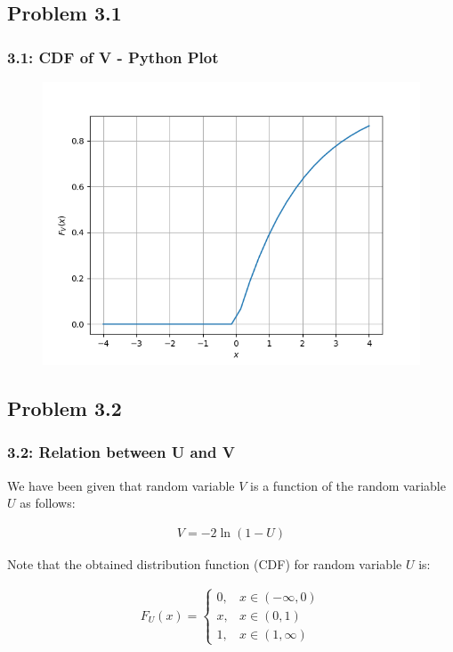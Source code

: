 \documentclass{beamer}
\begin{document}
\subsection{Problem 3.1}
\begin{frame}
	\frametitle{3.1: CDF of V - Python Plot}
	\begin{figure}
		\centerline{\includegraphics[width=\textheight]{../figs/log_cdf.png}}
		\label{fig6}
	\end{figure}
	
\end{frame}	

\subsection{Problem 3.2}
\begin{frame}
	\frametitle{3.2: Relation between U and V}

	We have been given that random variable $V$ is a function of the random variable $U$ as follows:
	
	\begin{align}
		V = -2\ln{(1 - U)}
		\label{eq:FuncRV}
	\end{align}

	Note that the obtained distribution function (CDF) for random variable $U$ is:

	\begin{align}
		F_U(x) = 
		\begin{cases}
			0, & x \in (-\infty, 0) \\
			x, & x \in (0, 1) \\
			1, & x \in (1, \infty)
		\end{cases}
		\label{eq:CDF_U}
	\end{align}
\end{frame}
\end{document}

